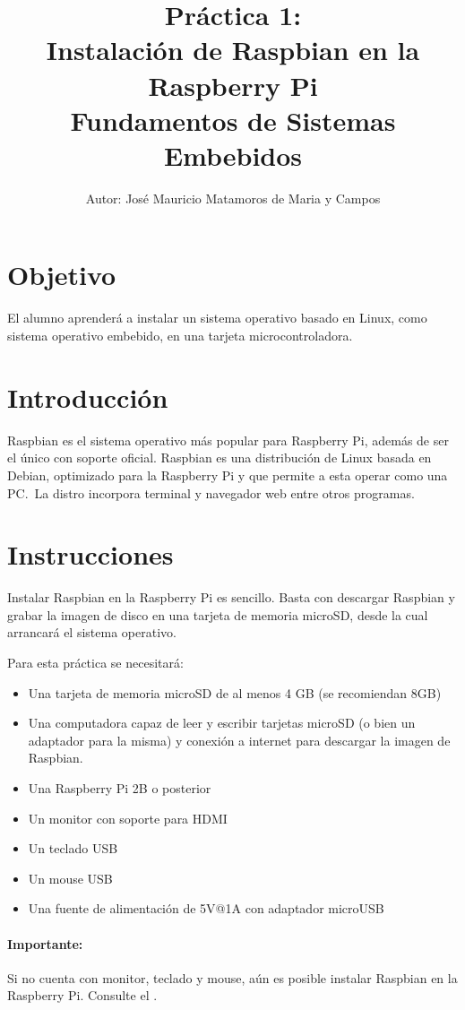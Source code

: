 \documentclass[letterpaper,10.5pt]{article}
\author{\footnotesize Autor: José Mauricio Matamoros de Maria y Campos}
\title{Práctica 1:\\Instalación de Raspbian en la Raspberry Pi\\
{\large Fundamentos de Sistemas Embebidos}}
\date{}
\begin{document}
\maketitle

\section{Objetivo}%
\label{sec:objective}
El alumno aprenderá a instalar un sistema operativo basado en Linux, como sistema operativo embebido, en una tarjeta microcontroladora.

\section{Introducción}%
\label{sec:introduction}
Raspbian es el sistema operativo más popular para Raspberry Pi, además de ser el único con soporte oficial.
Raspbian es una distribución de Linux basada en Debian, optimizado para la Raspberry Pi y que permite a esta operar como una PC.~La distro incorpora terminal y navegador web entre otros programas.

\section{Instrucciones}%
\label{sec:instructions}

Instalar Raspbian en la Raspberry Pi es sencillo.
Basta con descargar Raspbian y grabar la imagen de disco en una tarjeta de memoria microSD, desde la cual arrancará el sistema operativo.

Para esta práctica se necesitará:
\begin{itemize}[nosep]
	\item Una tarjeta de memoria microSD de al menos 4 GB (se recomiendan 8GB)
	\item Una computadora capaz de leer y escribir tarjetas microSD (o bien un adaptador para la misma) y conexión a internet para descargar la imagen de Raspbian.
	\item Una Raspberry Pi 2B o posterior
	\item Un monitor con soporte para HDMI
	\item Un teclado USB
	\item Un mouse USB
	\item Una fuente de alimentación de 5V@1A con adaptador microUSB
\end{itemize}

\paragraph*{Importante:} Si no cuenta con monitor, teclado y mouse, aún es posible instalar Raspbian en la Raspberry Pi. Consulte el .
\end{document}
